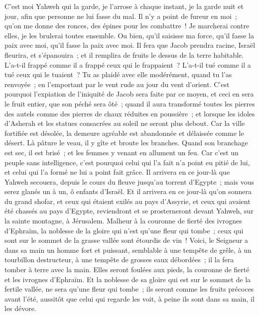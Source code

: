 \begin{multicols}{2}
C'est moi Yahweh qui la garde, je l'arrose à chaque instant, je la garde nuit et jour, afin que personne ne lui fasse du mal.
Il n'y a point de fureur en moi~; qu'on me donne des ronces, des épines pour les combattre~! Je marcherai contre elles, je les brulerai toutes ensemble.
Ou bien, qu'il saisisse ma force, qu'il fasse la paix avec moi, qu'il fasse la paix avec moi.
Il fera que Jacob prendra racine, Israël fleurira, et s'épanouira~; et il remplira de fruits le dessus de la terre habitable.
L'a-t-il frappé comme il a frappé ceux qui le frappaient~? L'a-t-il tué comme il a tué ceux qui le tuaient~?
Tu as plaidé avec elle modérément, quand tu l'as renvoyée~; en l'emportant par le vent rude au jour du vent d'orient.
C'est pourquoi l'expiation de l'iniquité de Jacob sera faite par ce moyen, et ceci en sera le fruit entier, que son péché sera ôté~; quand il aura transformé toutes les pierres des autels comme des pierres de chaux réduites en poussière~; et lorsque les idoles d'Asherah et les statues consacrées au soleil ne seront plus debout.
Car la ville fortifiée est désolée, la demeure agréable est abandonnée et délaissée comme le désert. Là pâture le veau, il y gîte et broute les branches.
Quand son branchage est sec, il est brisé~; et les femmes y venant en allument un feu. Car c'est un peuple sans intelligence, c'est pourquoi celui qui l'a fait n'a point eu pitié de lui, et celui qui l'a formé ne lui a point fait grâce.
Il arrivera en ce jour-là que Yahweh secouera, depuis le cours du fleuve jusqu'au torrent d'Egypte~; mais vous serez glanés un à un, ô enfants d'Israël.
Et il arrivera en ce jour-là qu'on sonnera du grand shofar, et ceux qui étaient exilés au pays d'Assyrie, et ceux qui avaient été chassés au pays d'Egypte, reviendront et se prosterneront devant Yahweh, sur la sainte montagne, à Jérusalem.
\VerseOne{}Malheur à la couronne de fierté des ivrognes d'Ephraïm, la noblesse de la gloire qui n'est qu'une fleur qui tombe~; ceux qui sont sur le sommet de la grasse vallée sont étourdis de vin~!
Voici, le Seigneur a dans sa main un homme fort et puissant, semblable à une tempête de grêle, à un tourbillon destructeur, à une tempête de grosses eaux débordées~; il la fera tomber à terre avec la main.
Elles seront foulées aux pieds, la couronne de fierté et les ivrognes d'Ephraïm.
Et la noblesse de sa gloire qui est sur le sommet de la fertile vallée, ne sera qu'une fleur qui tombe~; ils seront comme les fruits précoces avant l'été, aussitôt que celui qui regarde les voit, à peine ils sont dans sa main, il les dévore. 

\end{multicols}
